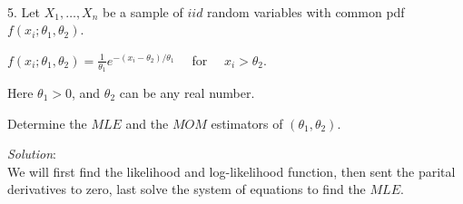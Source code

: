 \documentclass[12pt]{article}
\newcommand{\XB}{\color{black}}
\newcommand{\XBB}{\color{blue}}
\newcommand{\ds}{\displaystyle}
\begin{document}
\vspace{2.5mm}

\newpage
\XBB\hrulefill\XB \\

5. Let $ X_{1},\dots,X_{n} $ be a sample of $ iid $ random variables with common pdf $ f(x_{i}; \theta_{1}, \theta_{2}) $. \\

\begin{center}
    $ \ds f(x_{i}; \theta_{1}, \theta_{2}) = \frac{1}{\theta_{1}}e^{-(x_{i} - \theta_{2}) / \theta_{1}} \quad $ for $ \quad  x_{i} > \theta_{2} $. 
\end{center} 

Here $ \theta_{1} > 0 $, and $ \theta_{2} $ can be any real number.

Determine the $ MLE $ and the $ MOM $ estimators of $ (\theta_{1}, \theta_{2}) $. \\

\XBB\hrulefill\XB 
\vspace{5mm}

\textit{Solution}:
\vspace{2.5mm} \\

\noindent
We will first find the likelihood and log-likelihood function, then sent the parital derivatives to zero, last solve the system of equations to find the $ MLE $.
\end{document}
